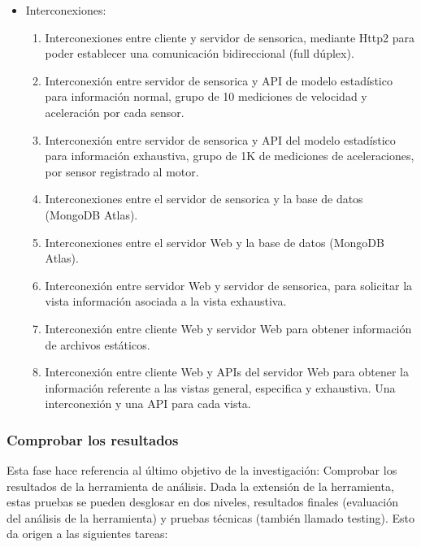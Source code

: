 \begin{itemize}
    \item Interconexiones:
        \begin{enumerate}
            \item Interconexiones entre cliente y servidor de sensorica, mediante
                Http2 para poder establecer una comunicación bidireccional (full dúplex).
            \item Interconexión entre servidor de sensorica y API de modelo
                estadístico para información normal, grupo de 10
                mediciones de velocidad y aceleración por cada sensor.
            \item Interconexión entre servidor de sensorica y API del modelo
                estadístico para información exhaustiva, grupo de 1K de mediciones
                de aceleraciones, por sensor registrado al motor.
            \item Interconexiones entre el servidor de sensorica y la base de datos
                (MongoDB Atlas).
            \item Interconexiones entre el servidor Web y la base de datos (MongoDB Atlas).
            \item Interconexión entre servidor Web y servidor de sensorica, para
                solicitar la vista información asociada a la vista exhaustiva.
            \item Interconexión entre cliente Web y servidor Web para obtener
                información de archivos estáticos.
            \item Interconexión entre cliente Web y APIs del servidor Web para
                obtener la información referente a las vistas general, especifica
                y exhaustiva. Una interconexión y una API para cada vista.
        \end{enumerate}
\end{itemize}


\subsubsection{Comprobar los resultados}
Esta fase hace referencia al último objetivo de la investigación: Comprobar los
resultados de la herramienta de análisis. Dada la extensión de la herramienta,
estas pruebas se pueden desglosar en dos niveles, resultados finales (evaluación
del análisis de la herramienta) y pruebas técnicas (también llamado testing).
Esto da origen a las siguientes tareas:

